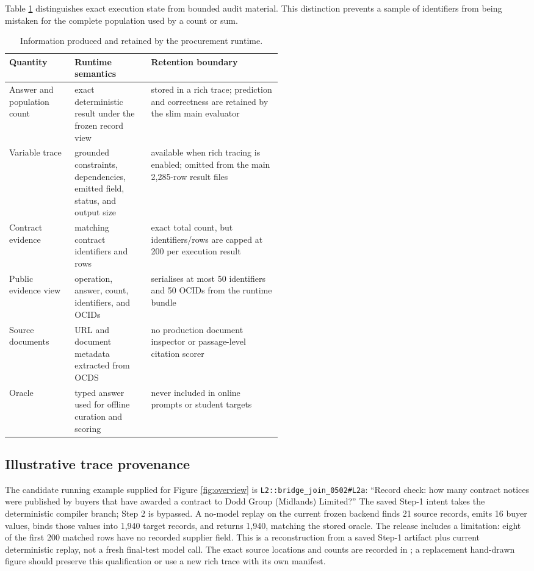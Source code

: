 Table \ref{tab:evidence-contract} distinguishes exact execution state from bounded audit material.
This distinction prevents a sample of identifiers from being mistaken for the complete population
used by a count or sum.

\begin{table}[h]
  \centering
  \caption{Information produced and retained by the procurement runtime.}
  \label{tab:evidence-contract}
  \small
  \begin{tabularx}{\linewidth}{p{0.24\linewidth}p{0.28\linewidth}X}
    \toprule
    Quantity & Runtime semantics & Retention boundary \\
    \midrule
    Answer and population count & exact deterministic result under the frozen record view & stored in a rich trace; prediction and correctness are retained by the slim main evaluator \\
    Variable trace & grounded constraints, dependencies, emitted field, status, and output size & available when rich tracing is enabled; omitted from the main 2,285-row result files \\
    Contract evidence & matching contract identifiers and rows & exact total count, but identifiers/rows are capped at 200 per execution result \\
    Public evidence view & operation, answer, count, identifiers, and OCIDs & serialises at most 50 identifiers and 50 OCIDs from the runtime bundle \\
    Source documents & URL and document metadata extracted from OCDS & no production document inspector or passage-level citation scorer \\
    Oracle & typed answer used for offline curation and scoring & never included in online prompts or student targets \\
    \bottomrule
  \end{tabularx}
\end{table}

\subsection{Illustrative trace provenance}

The candidate running example supplied for Figure \ref{fig:overview} is
\texttt{L2::bridge\_join\_0502\#L2a}: ``Record check: how many contract notices were published by
buyers that have awarded a contract to Dodd Group (Midlands) Limited?''  The saved Step-1 intent takes the
deterministic compiler branch; Step 2 is bypassed.  A no-model replay on the current frozen backend
finds 21 source records, emits 16 buyer values, binds those values into 1,940 target records, and
returns 1,940, matching the stored oracle.  The release includes a limitation: eight of the first
200 matched rows have no recorded supplier field.  This is a reconstruction from a saved Step-1
artifact plus current deterministic replay, not a fresh final-test model call.  The exact source
locations and counts are recorded in
; a replacement hand-drawn figure
should preserve this qualification or use a new rich trace with its own manifest.

